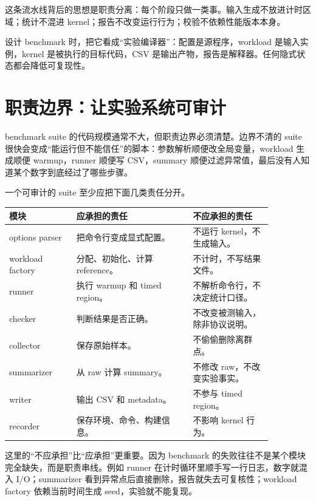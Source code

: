这条流水线背后的思想是职责分离：每个阶段只做一类事。输入生成不放进计时区域；统计不混进 kernel；报告不改变运行行为；校验不依赖性能版本本身。

\begin{mentalmodel}
设计 benchmark 时，把它看成“实验编译器”：配置是源程序，workload 是输入实例，kernel 是被执行的目标代码，CSV 是输出产物，报告是解释器。任何隐式状态都会降低可复现性。
\end{mentalmodel}

\section{职责边界：让实验系统可审计}

benchmark suite 的代码规模通常不大，但职责边界必须清楚。边界不清的 suite 很快会变成“能运行但不能信任”的脚本：参数解析顺便改全局变量，workload 生成顺便 warmup，runner 顺便写 CSV，summary 顺便过滤异常值，最后没有人知道某个数字到底经过了哪些步骤。

一个可审计的 suite 至少应把下面几类责任分开。

\begin{center}
\begin{tabular}{p{0.22\linewidth}p{0.38\linewidth}p{0.26\linewidth}}
\toprule
模块 & 应承担的责任 & 不应承担的责任 \\
\midrule
options parser & 把命令行变成显式配置。 & 不运行 kernel，不生成输入。 \\
workload factory & 分配、初始化、计算 reference。 & 不计时，不写结果文件。 \\
runner & 执行 warmup 和 timed region。 & 不解析命令行，不决定统计口径。 \\
checker & 判断结果是否正确。 & 不改变被测输入，除非协议说明。 \\
collector & 保存原始样本。 & 不偷偷删除离群点。 \\
summarizer & 从 raw 计算 summary。 & 不修改 raw，不改变实验事实。 \\
writer & 输出 CSV 和 metadata。 & 不参与 timed region。 \\
recorder & 保存环境、命令、构建信息。 & 不影响 kernel 行为。 \\
\bottomrule
\end{tabular}
\end{center}

这里的“不应承担”比“应承担”更重要。因为 benchmark 的失败往往不是某个模块完全缺失，而是职责串线。例如 runner 在计时循环里顺手写一行日志，数字就混入 I/O；summarizer 看到异常点后直接删除，报告就失去可复核性；workload factory 依赖当前时间生成 seed，实验就不能复现。


